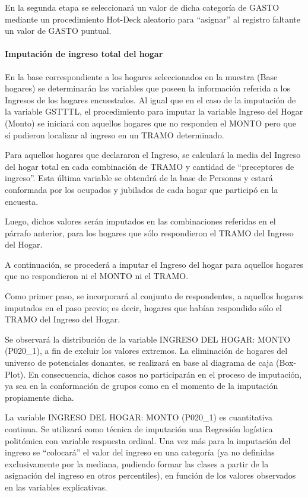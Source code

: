 \documentclass[
  openany]{book}
\begin{document}
En la segunda etapa se seleccionará un valor de dicha categoría de GASTO mediante un procedimiento Hot-Deck aleatorio para ``asignar'' al registro faltante un valor de GASTO puntual.

\hypertarget{imputaciuxf3n-de-ingreso-total-del-hogar}{%
\paragraph{Imputación de ingreso total del hogar}\label{imputaciuxf3n-de-ingreso-total-del-hogar}}

En la base correspondiente a los hogares seleccionados en la muestra (Base hogares) se determinarán las variables que poseen la información referida a los Ingresos de los hogares encuestados. Al igual que en el caso de la imputación de la variable GSTTTL, el procedimiento para imputar la variable Ingreso del Hogar (Monto) se iniciará con aquellos hogares que no responden el MONTO pero que sí pudieron localizar al ingreso en un TRAMO determinado.

Para aquellos hogares que declararon el Ingreso, se calculará la media del Ingreso del hogar total en cada combinación de TRAMO y cantidad de ``preceptores de ingreso''. Esta última variable se obtendrá de la base de Personas y estará conformada por los ocupados y jubilados de cada hogar que participó en la encuesta.

Luego, dichos valores serán imputados en las combinaciones referidas en el párrafo anterior, para los hogares que sólo respondieron el TRAMO del Ingreso del Hogar.

A continuación, se procederá a imputar el Ingreso del hogar para aquellos hogares que no respondieron ni el MONTO ni el TRAMO.

Como primer paso, se incorporará al conjunto de respondentes, a aquellos hogares imputados en el paso previo; es decir, hogares que habían respondido sólo el TRAMO del Ingreso del Hogar.

Se observará la distribución de la variable INGRESO DEL HOGAR: MONTO (P020\_1), a fin de excluir los valores extremos. La eliminación de hogares del universo de potenciales donantes, se realizará en base al diagrama de caja (Box-Plot). En consecuencia, dichos casos no participarán en el proceso de imputación, ya sea en la conformación de grupos como en el momento de la imputación propiamente dicha.

La variable INGRESO DEL HOGAR: MONTO (P020\_1) es cuantitativa continua. Se utilizará como técnica de imputación una Regresión logística politómica con variable respuesta ordinal. Una vez más para la imputación del ingreso se ``colocará'' el valor del ingreso en una categoría (ya no definidas exclusivamente por la mediana, pudiendo formar las clases a partir de la asignación del ingreso en otros percentiles), en función de los valores observados en las variables explicativas.
\end{document}
